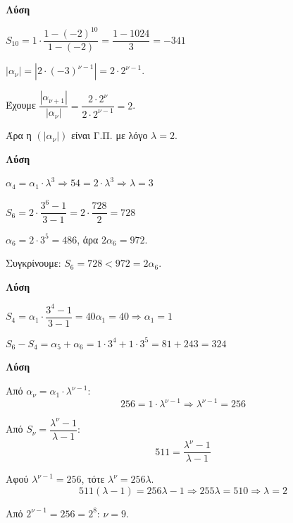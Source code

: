 \documentclass[11pt,a4paper,modern]{FFExercises}
\begin{document}
\askhsh
\textbf{Λύση}
\begin{alist}
  \item $S_{10} = 1 \cdot \dfrac{1 - (-2)^{10}}{1 - (-2)} = \dfrac{1 - 1024}{3} = -341$
  
  \item $|\alpha_\nu| = |2 \cdot (-3)^{\nu-1}| = 2 \cdot 2^{\nu-1}$.
  
  Έχουμε $\dfrac{|\alpha_{\nu+1}|}{|\alpha_\nu|} = \dfrac{2 \cdot 2^\nu}{2 \cdot 2^{\nu-1}} = 2$.
  
  Άρα η $(|\alpha_\nu|)$ είναι Γ.Π. με λόγο $\lambda = 2$.
\end{alist}

\askhsh
\textbf{Λύση}
\begin{alist}
  \item $\alpha_4 = \alpha_1 \cdot \lambda^3 \Rightarrow 54 = 2 \cdot \lambda^3 \Rightarrow \lambda = 3$
  
  \item $S_6 = 2 \cdot \dfrac{3^6 - 1}{3 - 1} = 2 \cdot \dfrac{728}{2} = 728$
  
  \item $\alpha_6 = 2 \cdot 3^5 = 486$, άρα $2\alpha_6 = 972$.
  
  Συγκρίνουμε: $S_6 = 728 < 972 = 2\alpha_6$.
\end{alist}

\askhsh
\textbf{Λύση}
\begin{alist}
  \item $S_4 = \alpha_1 \cdot \dfrac{3^4 - 1}{3 - 1} = 40\alpha_1 = 40 \Rightarrow \alpha_1 = 1$
  
  \item $S_6 - S_4 = \alpha_5 + \alpha_6 = 1 \cdot 3^4 + 1 \cdot 3^5 = 81 + 243 = 324$
\end{alist}

\askhsh
\textbf{Λύση}

Από $\alpha_\nu = \alpha_1 \cdot \lambda^{\nu-1}$:
\[
256 = 1 \cdot \lambda^{\nu-1} \Rightarrow \lambda^{\nu-1} = 256
\]

Από $S_\nu = \dfrac{\lambda^\nu - 1}{\lambda - 1}$:
\[
511 = \frac{\lambda^\nu - 1}{\lambda - 1}
\]

Αφού $\lambda^{\nu-1} = 256$, τότε $\lambda^\nu = 256\lambda$.
\[
511(\lambda - 1) = 256\lambda - 1 \Rightarrow 255\lambda = 510 \Rightarrow \lambda = 2
\]

Από $2^{\nu-1} = 256 = 2^8$: $\nu = 9$.

\end{document}
